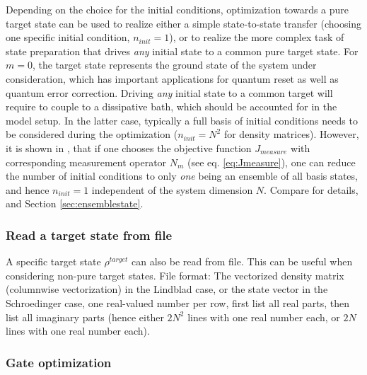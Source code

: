 \documentclass[11pt]{article}
\begin{document}
Depending on the choice for the initial conditions, optimization towards a pure target state can be used to realize either a simple state-to-state transfer (choosing one specific initial condition, $n_{init}=1$), or to realize the more complex task of state preparation that drives \textit{any} initial state to a common pure target state. 
For $m=0$, the target state represents the ground state of the system under consideration, which has important applications for quantum reset as well as quantum error correction. Driving \textit{any} initial state to a common target will require to couple to a dissipative bath, which should be accounted for in the model setup. In the latter case, typically a full basis of initial conditions needs to be considered during the optimization ($n_{init}=N^2$ for density matrices). However, it is shown in \cite{guenther2021quantum}, that if one chooses the objective function $J_{measure}$ with corresponding measurement operator $N_m$ (see eq. \eqref{eq:Jmeasure}), one can reduce the number of initial conditions to only \textit{one} being an ensemble of all basis states, and hence $n_{init}=1$ independent of the system dimension $N$. Compare \cite{guenther2021quantum} for details, and Section \ref{sec:ensemblestate}. 



\subsubsection{Read a target state from file}
A specific target state $\rho^{target}$ can also be read from file. This can be useful when considering non-pure target states. File format: The vectorized density matrix (columnwise vectorization) in the Lindblad case, or the state vector in the Schroedinger case, one real-valued number per row, first list all real parts, then list all imaginary parts (hence either $2N^2$ lines with one real number each, or $2N$ lines with one real number each). 
 
\subsubsection{Gate optimization}
\end{document}
